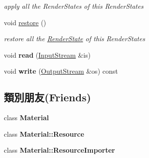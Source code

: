 \begin{DoxyCompactItemize}
\begin{DoxyCompactList}\small\item\em apply all the Render\+States of this Render\+States \end{DoxyCompactList}\item 
void \hyperlink{class_i_dream_sky_1_1_material_1_1_shader_state_a1133fd441e4aacaddaf98e80bc5565b3}{restore} ()\hypertarget{class_i_dream_sky_1_1_material_1_1_shader_state_a1133fd441e4aacaddaf98e80bc5565b3}{}\label{class_i_dream_sky_1_1_material_1_1_shader_state_a1133fd441e4aacaddaf98e80bc5565b3}

\begin{DoxyCompactList}\small\item\em restore all the \hyperlink{class_i_dream_sky_1_1_material_1_1_render_state}{Render\+State} of this Render\+States \end{DoxyCompactList}\item 
void {\bfseries read} (\hyperlink{class_i_dream_sky_1_1_input_stream}{Input\+Stream} \&is)\hypertarget{class_i_dream_sky_1_1_material_1_1_shader_state_a255e2b883c34a27299126b3fd5b0edf5}{}\label{class_i_dream_sky_1_1_material_1_1_shader_state_a255e2b883c34a27299126b3fd5b0edf5}

\item 
void {\bfseries write} (\hyperlink{class_i_dream_sky_1_1_output_stream}{Output\+Stream} \&os) const \hypertarget{class_i_dream_sky_1_1_material_1_1_shader_state_a0f3b85d1ebdc4ce3c4ccb600e8415762}{}\label{class_i_dream_sky_1_1_material_1_1_shader_state_a0f3b85d1ebdc4ce3c4ccb600e8415762}

\end{DoxyCompactItemize}
\subsection*{類別朋友(Friends)}
\begin{DoxyCompactItemize}
\item 
class {\bfseries Material}\hypertarget{class_i_dream_sky_1_1_material_1_1_shader_state_aa1212b6e372a0f45d2c01f3cd203af77}{}\label{class_i_dream_sky_1_1_material_1_1_shader_state_aa1212b6e372a0f45d2c01f3cd203af77}

\item 
class {\bfseries Material\+::\+Resource}\hypertarget{class_i_dream_sky_1_1_material_1_1_shader_state_a6a002bcee6c883089769545352e9ccbd}{}\label{class_i_dream_sky_1_1_material_1_1_shader_state_a6a002bcee6c883089769545352e9ccbd}

\item 
class {\bfseries Material\+::\+Resource\+Importer}\hypertarget{class_i_dream_sky_1_1_material_1_1_shader_state_a941a71e735085112a8496c27836506ee}{}\label{class_i_dream_sky_1_1_material_1_1_shader_state_a941a71e735085112a8496c27836506ee}

\end{DoxyCompactItemize}


